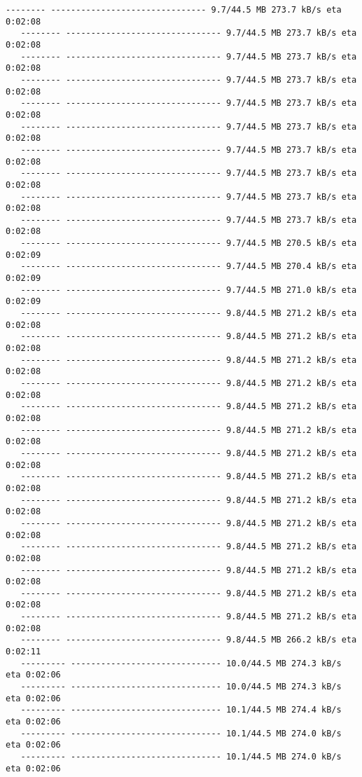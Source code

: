 \documentclass[11pt]{article}
\begin{document}
\begin{Verbatim}[commandchars=\\\{\}]
   -------- ------------------------------- 9.7/44.5 MB 273.7 kB/s eta 0:02:08
   -------- ------------------------------- 9.7/44.5 MB 273.7 kB/s eta 0:02:08
   -------- ------------------------------- 9.7/44.5 MB 273.7 kB/s eta 0:02:08
   -------- ------------------------------- 9.7/44.5 MB 273.7 kB/s eta 0:02:08
   -------- ------------------------------- 9.7/44.5 MB 273.7 kB/s eta 0:02:08
   -------- ------------------------------- 9.7/44.5 MB 273.7 kB/s eta 0:02:08
   -------- ------------------------------- 9.7/44.5 MB 273.7 kB/s eta 0:02:08
   -------- ------------------------------- 9.7/44.5 MB 273.7 kB/s eta 0:02:08
   -------- ------------------------------- 9.7/44.5 MB 273.7 kB/s eta 0:02:08
   -------- ------------------------------- 9.7/44.5 MB 273.7 kB/s eta 0:02:08
   -------- ------------------------------- 9.7/44.5 MB 270.5 kB/s eta 0:02:09
   -------- ------------------------------- 9.7/44.5 MB 270.4 kB/s eta 0:02:09
   -------- ------------------------------- 9.7/44.5 MB 271.0 kB/s eta 0:02:09
   -------- ------------------------------- 9.8/44.5 MB 271.2 kB/s eta 0:02:08
   -------- ------------------------------- 9.8/44.5 MB 271.2 kB/s eta 0:02:08
   -------- ------------------------------- 9.8/44.5 MB 271.2 kB/s eta 0:02:08
   -------- ------------------------------- 9.8/44.5 MB 271.2 kB/s eta 0:02:08
   -------- ------------------------------- 9.8/44.5 MB 271.2 kB/s eta 0:02:08
   -------- ------------------------------- 9.8/44.5 MB 271.2 kB/s eta 0:02:08
   -------- ------------------------------- 9.8/44.5 MB 271.2 kB/s eta 0:02:08
   -------- ------------------------------- 9.8/44.5 MB 271.2 kB/s eta 0:02:08
   -------- ------------------------------- 9.8/44.5 MB 271.2 kB/s eta 0:02:08
   -------- ------------------------------- 9.8/44.5 MB 271.2 kB/s eta 0:02:08
   -------- ------------------------------- 9.8/44.5 MB 271.2 kB/s eta 0:02:08
   -------- ------------------------------- 9.8/44.5 MB 271.2 kB/s eta 0:02:08
   -------- ------------------------------- 9.8/44.5 MB 271.2 kB/s eta 0:02:08
   -------- ------------------------------- 9.8/44.5 MB 271.2 kB/s eta 0:02:08
   -------- ------------------------------- 9.8/44.5 MB 266.2 kB/s eta 0:02:11
   --------- ------------------------------ 10.0/44.5 MB 274.3 kB/s eta 0:02:06
   --------- ------------------------------ 10.0/44.5 MB 274.3 kB/s eta 0:02:06
   --------- ------------------------------ 10.1/44.5 MB 274.4 kB/s eta 0:02:06
   --------- ------------------------------ 10.1/44.5 MB 274.0 kB/s eta 0:02:06
   --------- ------------------------------ 10.1/44.5 MB 274.0 kB/s eta 0:02:06

\end{Verbatim}
\end{document}
